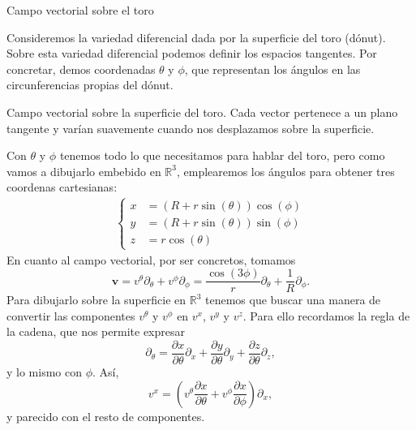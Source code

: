 \begin{example}
    {Campo vectorial sobre el toro
    \label{ej.3-toro_campo_vectorial}}

    Consideremos la variedad diferencial dada por la superficie del toro (dónut). Sobre esta variedad diferencial podemos definir los espacios tangentes. Por concretar, demos coordenadas \(\theta\) y \(\phi\), que representan los ángulos en las circunferencias propias del dónut. 

    \begin{figbox}
        {Campo vectorial sobre la superficie del toro. Cada vector pertenece a un plano tangente y varían suavemente cuando nos desplazamos sobre la superficie. 
        \label{fig.3-toro_campo_vectorial}}
        
    \end{figbox}
    
    Con \(\theta\) y \(\phi\) tenemos todo lo que necesitamos para hablar del toro, pero como vamos a dibujarlo embebido en \(\mathbb{R}^3\), emplearemos los ángulos para obtener tres coordenas cartesianas:
    \begin{align*}
        \left\{\begin{aligned}
            x &= (R + r\sin(\theta))\cos(\phi)\\
            y &= (R + r\sin(\theta))\sin(\phi)\\
            z &= r\cos(\theta)
        \end{aligned}\right.
    \end{align*}
    En cuanto al campo vectorial, por ser concretos, tomamos
    \begin{equation*}
        \mathbf{v} = v^\theta\partial_\theta + v^\phi\partial_\phi = \frac{\cos(3\phi)}{r}\partial_\theta + \frac{1}{R}\partial_\phi.
    \end{equation*}
    Para dibujarlo sobre la superficie en \(\mathbb{R}^3\) tenemos que buscar una manera de convertir las componentes \(v^\theta\) y \(v^\phi\) en \(v^{x}\), \(v^{y}\) y \(v^{z}\). Para ello recordamos la regla de la cadena, que nos permite expresar
    \begin{equation*}
        \partial_\theta = \frac{\partial x}{\partial \theta} \partial_x + \frac{\partial y}{\partial \theta} \partial_y + \frac{\partial z}{\partial \theta} \partial_z,
    \end{equation*}
    y lo mismo con \(\phi\). Así, 
    \begin{equation*}
        v^x = \left(v^\theta \frac{\partial x}{\partial \theta} + v^\phi \frac{\partial x}{\partial \phi}\right) \partial_x,
    \end{equation*}
    y parecido con el resto de componentes.
\end{example}

